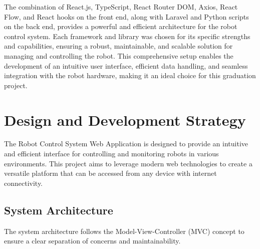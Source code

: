 The combination of React.js, TypeScript, React Router DOM, Axios, React Flow, and React hooks on the front end, along with Laravel and Python scripts on the back end, provides a powerful and efficient architecture for the robot control system. Each framework and library was chosen for its specific strengths and capabilities, ensuring a robust, maintainable, and scalable solution for managing and controlling the robot. This comprehensive setup enables the development of an intuitive user interface, efficient data handling, and seamless integration with the robot hardware, making it an ideal choice for this graduation project.


\section{Design and Development Strategy}

The Robot Control System Web Application is designed to provide an intuitive and efficient interface for controlling and monitoring robots in various environments. This project aims to leverage modern web technologies to create a versatile platform that can be accessed from any device with internet connectivity.
\newpage
\subsection{System Architecture}
\vspace{-1.5mm}
The system architecture follows the Model-View-Controller (MVC) concept to ensure a clear separation of concerns and maintainability.
\vspace{-3mm}
